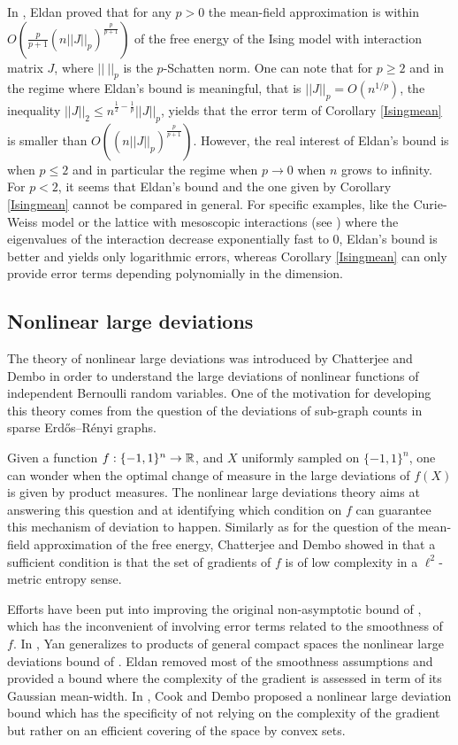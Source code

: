 \documentclass[a4paper,oneside,11pt]{article}
\begin{document}
\begin{Rem}
In \cite{Eldanmean}, Eldan proved that for any $p>0$ the mean-field approximation is within  $O( \frac{p}{p+1} (n||J||_p)^{\frac{p}{p+1}})$ of the free energy of the Ising model with interaction matrix $J$, where $||\ ||_p$ is the $p$-Schatten norm.
One can note that for $p\geq 2$ and in the regime where Eldan's bound is meaningful, that is $||J||_p =O( n^{1/p})$, the inequality $|| J||_2 \leq n^{\frac{1}{2}-\frac{1}{p}} ||J||_p$, yields that the error term of Corollary \ref{Isingmean} is smaller than $O( (n||J||_p)^{\frac{p}{p+1}})$. However, the real interest of Eldan's bound is when $p\leq 2$ and in particular the regime when $p\to 0$ when $n$ grows to infinity. For $p<2$, it seems that Eldan's bound and the one given by Corollary \ref{Isingmean} cannot be compared in general. For specific examples, like the Curie-Weiss model or the lattice with mesoscopic interactions (see \cite[example 2]{Eldanmean}) where the eigenvalues of the interaction decrease exponentially fast to $0$, Eldan's bound is  better and yields only logarithmic errors, whereas Corollary \ref{Isingmean} can only provide error terms depending polynomially in the dimension. 
\end{Rem}



\subsection{Nonlinear large deviations} 
The theory of nonlinear large deviations was introduced by Chatterjee and Dembo \cite{CD} in order to understand the large deviations of nonlinear functions of independent Bernoulli random variables. One of the motivation for developing this theory comes from the question of the deviations of sub-graph counts in sparse Erd\H{o}s--R\'enyi graphs. 

Given a function $f : \{-1,1\}^n \to \mathbb{R}$, and $X$ uniformly sampled on $\{-1,1\}^n$, one can wonder when the optimal change of measure in the large deviations of $f(X)$ is given by product measures. The nonlinear large deviations theory aims at answering this question and at identifying which condition on $f$ can guarantee this mechanism of deviation to happen. Similarly as for the question of the mean-field approximation of the free energy, Chatterjee and Dembo showed in \cite{CD} that a sufficient condition is that the set of gradients of $f$ is of low complexity in a $\ell^2$-metric entropy sense. 

Efforts have been put into improving the original non-asymptotic bound of \cite{CD}, which has the inconvenient of involving error terms related to the smoothness of $f$. In \cite{Yan}, Yan generalizes to products of general compact spaces the nonlinear large deviations bound of \cite{CD}. Eldan \cite{Eldan} removed most of the smoothness assumptions and provided a bound where the complexity of the gradient is assessed in term of its Gaussian mean-width. In \cite[Corollary 2.2]{CoD}, Cook and Dembo proposed a nonlinear large deviation bound which has the specificity of not relying on the complexity of the gradient  but rather on an efficient covering of  the space by convex sets.
\end{document}
